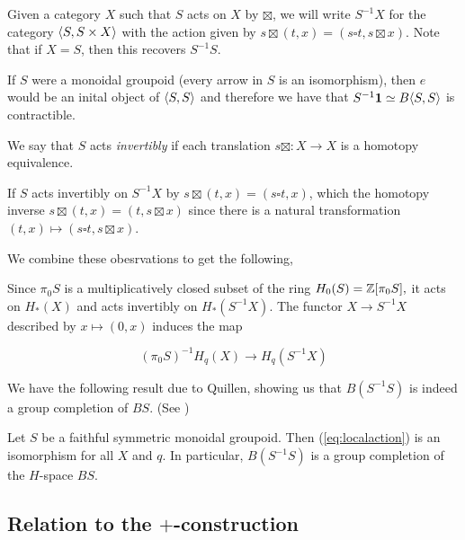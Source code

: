 \begin{example}
Given a category $X$ such that $S$ acts on $X$ by $\boxtimes$, we will write $S^{-1}X$ for the category $\langle S, S \times X \rangle$ with the action
given by $s \boxtimes (t,x) = (s \square t, s \boxtimes x)$.
Note that if $X = S$, then this recovers $S^{-1}S$.
\end{example}

\begin{remark}\label{translation contractible}
If $S$ were a monoidal groupoid (every arrow in $S$ is an isomorphism), then $e$ would be an inital object of $\langle S,S \rangle$ and therefore
we have that
$S^{-1} \mathbf 1 \simeq B \langle S,S \rangle$
is contractible.
\end{remark}

\begin{definition}
We say that $S$ acts \emph{invertibly} if each translation $s \boxtimes : X \to X$ is a homotopy equivalence.
\end{definition}

If $S$ acts invertibly on $S^{-1}X$ by $s \boxtimes (t,x) = (s \square t, x)$, which the homotopy inverse $s \boxtimes (t,x) = (t,s \boxtimes x)$
since there is a natural transformation $(t,x) \mapsto (s \square t, s \boxtimes x)$.

We combine these obesrvations to get the following,
\begin{proposition}
Since $\pi_0S$ is a multiplicatively closed subset of the ring $H_0(S) = \mathbb{Z}[\pi_0S],$
it acts on $H_*(X)$ and acts invertibly on $H_*(S^{-1}X)$.
The functor $X \to S^{-1}X$ described by $x \mapsto (0,x)$ induces the map

\begin{equation}
  (\pi_0S)^{-1} H_q(X) \to H_q(S^{-1}X)
  \label{eq:localaction}
\end{equation}
\end{proposition}

We have the following result due to Quillen, showing us that $B(S^{-1}S)$ is indeed a group completion of $BS$. (See \cite{Grayson})
\begin{theorem}[Quillen]\label{thm:BSgroup}
Let $S$ be a faithful symmetric monoidal groupoid. Then (\ref{eq:localaction}) is an isomorphism for all $X$ and $q$.
In particular, $B(S^{-1}S)$ is a group completion of the $H$-space $BS$.
\end{theorem}
\subsection{Relation to the $+$-construction}


